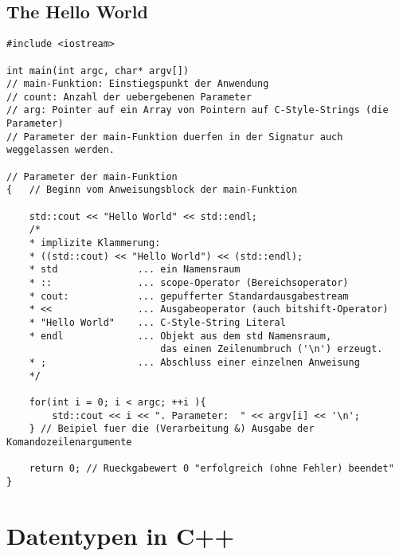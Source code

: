 \documentclass[a4paper]{report}
\theoremstyle{nonumberplain}
\begin{document}
\section{The Hello World}
\begin{lstlisting}
#include <iostream>

int main(int argc, char* argv[])
// main-Funktion: Einstiegspunkt der Anwendung
// count: Anzahl der uebergebenen Parameter
// arg: Pointer auf ein Array von Pointern auf C-Style-Strings (die Parameter)
// Parameter der main-Funktion duerfen in der Signatur auch weggelassen werden.

// Parameter der main-Funktion 
{   // Beginn vom Anweisungsblock der main-Funktion
	
	std::cout << "Hello World" << std::endl;
	/*
	* implizite Klammerung:
	* ((std::cout) << "Hello World") << (std::endl);
	* std              ... ein Namensraum
	* ::               ... scope-Operator (Bereichsoperator)
	* cout:            ... gepufferter Standardausgabestream
	* <<               ... Ausgabeoperator (auch bitshift-Operator)
	* "Hello World"    ... C-Style-String Literal
	* endl             ... Objekt aus dem std Namensraum,
	                       das einen Zeilenumbruch ('\n') erzeugt.
	* ;                ... Abschluss einer einzelnen Anweisung
	*/
	
	for(int i = 0; i < argc; ++i ){
		std::cout << i << ". Parameter:  " << argv[i] << '\n';
	} // Beipiel fuer die (Verarbeitung &) Ausgabe der Komandozeilenargumente
	
	return 0; // Rueckgabewert 0 "erfolgreich (ohne Fehler) beendet"
}

\end{lstlisting}


\chapter{Datentypen in C++}
\end{document}
